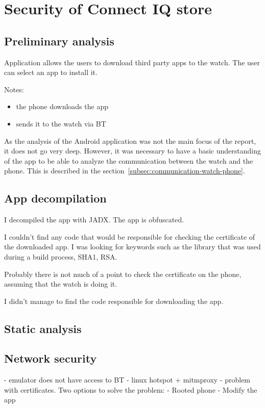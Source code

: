 \section{Security of Connect IQ store}
\subsection{Preliminary analysis}
Application allows the users to download third party apps to the watch.
The user can select an app to install it.

Notes:
\begin{itemize}
    \item the phone downloads the app
    \item sends it to the watch via BT
\end{itemize}

As the analysis of the Android application was not the main focus of the report, it does not go very deep.
However, it was necessary to have a basic understanding of the app to be able to analyze the communication between the watch and the phone.
This is described in the section~\ref{subsec:communication-watch-phone}.

\subsection{App decompilation}
I decompiled the app with JADX. The app is obfuscated.

I couldn't find any code that would be responsible for checking the certificate of the downloaded app.
I was looking for keywords such as the library that was used during a build process, SHA1, RSA\@.

Probably there is not much of a point to check the certificate on the phone, assuming that the watch is doing it.

I didn't manage to find the code responsible for downloading the app.
\subsection{Static analysis}

\subsection{Network security}
- emulator does not have access to BT
- linux hotspot + mitmproxy - problem with certificates.
Two options to solve the problem:
- Rooted phone
- Modify the app


